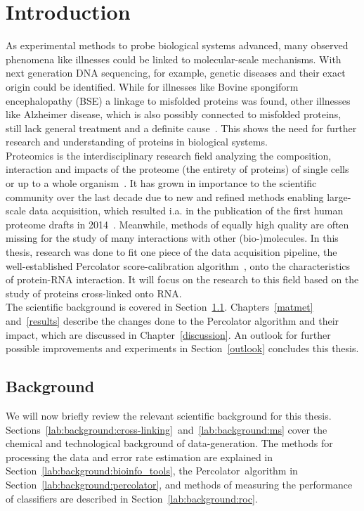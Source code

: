 
\chapter{Introduction}
\label{introduction}
As experimental methods to probe biological systems advanced, many observed phenomena like illnesses could be linked to molecular-scale mechanisms. With next generation DNA sequencing, for example, genetic diseases and their exact origin could be identified. While for illnesses like Bovine spongiform encephalopathy (BSE) a linkage to misfolded proteins was found, other illnesses like Alzheimer disease, which is also possibly connected to misfolded proteins, still lack general treatment and a definite cause~\cite{Burns2009}. This shows the need for further research and understanding of proteins in biological systems.\\
Proteomics is the interdisciplinary research field analyzing the composition, interaction and impacts of the proteome (the entirety of proteins) of single cells or up to a whole organism~\cite{Han2008, Sachsenberg2017}. It has grown in importance to the scientific community over the last decade due to new and refined methods enabling large-scale data acquisition, which resulted i.a. in the publication of the first human proteome drafts in 2014~\cite{Wilhelm2014, Kim2014}. Meanwhile, methods of equally high quality are often missing for the study of many interactions with other (bio-)molecules. In this thesis, research was done to fit one piece of the data acquisition pipeline, the well-established Percolator score-calibration algorithm~\cite{Granholm2012}, onto the characteristics of protein-RNA interaction. It will focus on the research to this field based on the study of proteins cross-linked onto RNA.\\
The scientific background is covered in Section~\ref{background}. Chapters~\ref{matmet} and~\ref{results} describe the changes done to the Percolator algorithm and their impact, which are discussed in Chapter~\ref{discussion}. An outlook for further possible improvements and experiments in Section~\ref{outlook} concludes this thesis.

\section{Background}
\label{background}
	We will now briefly review the relevant scientific background for this thesis. Sections~\ref{lab:background:cross-linking}~and~\ref{lab:background:ms} cover the chemical and technological background of data-generation. The methods for processing the data and error rate estimation are explained in Section~\ref{lab:background:bioinfo_tools}, the Percolator~algorithm in Section~\ref{lab:background:percolator}, and methods of measuring the performance of classifiers are described in Section~\ref{lab:background:roc}.
